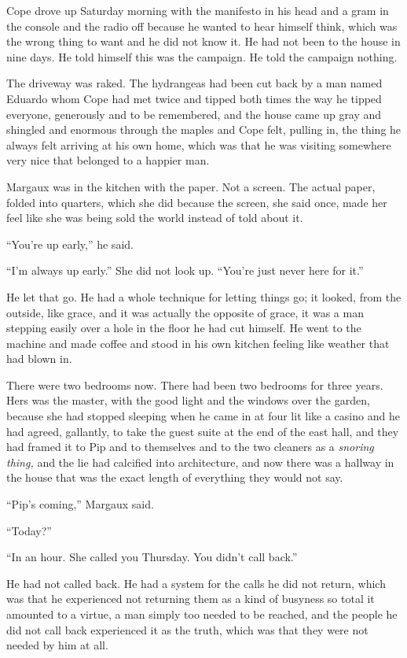 \documentclass[11pt,openany]{book}
\begin{document}
Cope drove up Saturday morning with the manifesto in his head and a gram in the console and the radio off because he wanted to hear himself think, which was the wrong thing to want and he did not know it. He had not been to the house in nine days. He told himself this was the campaign. He told the campaign nothing.

The driveway was raked. The hydrangeas had been cut back by a man named Eduardo whom Cope had met twice and tipped both times the way he tipped everyone, generously and to be remembered, and the house came up gray and shingled and enormous through the maples and Cope felt, pulling in, the thing he always felt arriving at his own home, which was that he was visiting somewhere very nice that belonged to a happier man.

Margaux was in the kitchen with the paper. Not a screen. The actual paper, folded into quarters, which she did because the screen, she said once, made her feel like she was being sold the world instead of told about it.

``You're up early,'' he said.

``I'm always up early.'' She did not look up. ``You're just never here for it.''

He let that go. He had a whole technique for letting things go; it looked, from the outside, like grace, and it was actually the opposite of grace, it was a man stepping easily over a hole in the floor he had cut himself. He went to the machine and made coffee and stood in his own kitchen feeling like weather that had blown in.

There were two bedrooms now. There had been two bedrooms for three years. Hers was the master, with the good light and the windows over the garden, because she had stopped sleeping when he came in at four lit like a casino and he had agreed, gallantly, to take the guest suite at the end of the east hall, and they had framed it to Pip and to themselves and to the two cleaners as a \textit{snoring thing,} and the lie had calcified into architecture, and now there was a hallway in the house that was the exact length of everything they would not say.

``Pip's coming,'' Margaux said.

``Today?''

``In an hour. She called you Thursday. You didn't call back.''

He had not called back. He had a system for the calls he did not return, which was that he experienced not returning them as a kind of busyness so total it amounted to a virtue, a man simply too needed to be reached, and the people he did not call back experienced it as the truth, which was that they were not needed by him at all.
\end{document}
